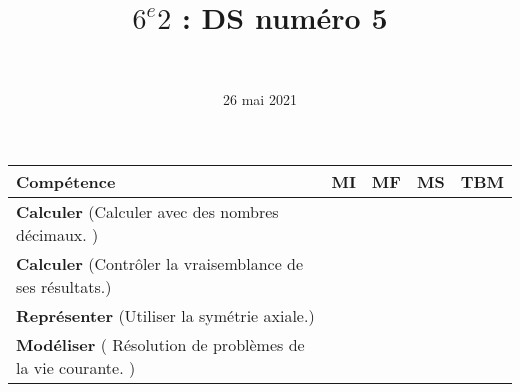 \documentclass[a4paper,11pt]{exam}
\author{\ }
\date{26 mai 2021}
\title{$6^e 2$ : DS num\'ero 5}
\begin{document}
%	

	\maketitle
	

\begin{small}
	\begin{center}
		\begin{tabular}{|@{\ }l@{\ }|@{\ }c@{\ }|@{\ }c@{\ }|@{\ }c@{\ }|@{\ }c@{\ }|}
			\hline
			\textbf{Compétence} & \textbf{MI} & \textbf{MF} & \textbf{MS} & \textbf{TBM} \\
			\hline
			\textbf{Calculer} (Calculer avec des nombres décimaux. ) &  \ \ & \ \ & \ \ & \ \  \\
			\hline	
			\textbf{Calculer} (Contrôler la vraisemblance de ses résultats.) & \ \ & \ \ &  \ \  & \ \ \\
			\hline
			\textbf{Représenter} (Utiliser la symétrie axiale.) & \ \ & \ \ &  \ \  & \ \ \\
			\hline
			\textbf{Modéliser} ( Résolution de problèmes de la vie courante. ) &  \ \ & \ \ & \ \ & \ \  \\
			\hline
		\end{tabular}
	\end{center}
\end{small}	

	
	
	




%








\label{LastPage}

%
\end{document}
